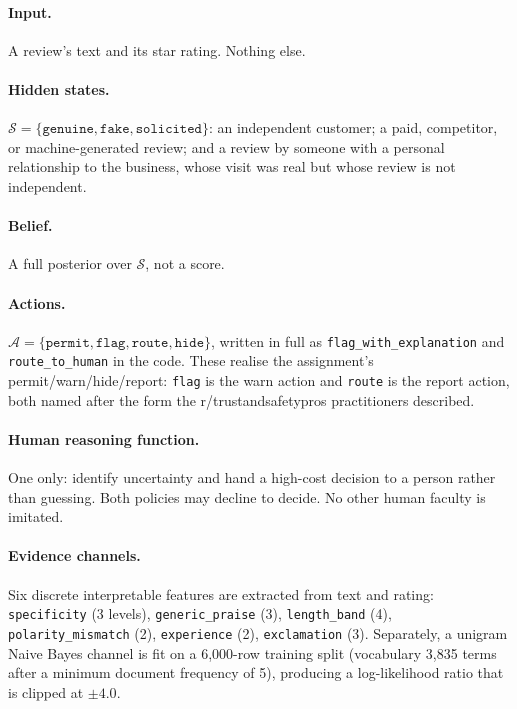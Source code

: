 \documentclass{article}
\begin{document}
\paragraph{Input.} A review's text and its star rating. Nothing else.

\paragraph{Hidden states.}
$\mathcal{S} = \{\texttt{genuine}, \texttt{fake}, \texttt{solicited}\}$:
an independent customer; a paid, competitor, or machine-generated review; and a
review by someone with a personal relationship to the business, whose visit was
real but whose review is not independent.

\paragraph{Belief.} A full posterior over $\mathcal{S}$, not a score.

\paragraph{Actions.}
$\mathcal{A} = \{\texttt{permit}, \texttt{flag}, \texttt{route},
\texttt{hide}\}$, written in full as \texttt{flag\_with\_explanation} and
\texttt{route\_to\_human} in the code. These realise the assignment's
permit/warn/hide/report: \texttt{flag} is the warn action
and \texttt{route} is the report action, both named after the form
the r/trustandsafetypros practitioners described.

\paragraph{Human reasoning function.}
One only: identify uncertainty and hand a high-cost decision to a person rather
than guessing. Both policies may decline to decide. No other human faculty is
imitated.

\paragraph{Evidence channels.}
Six discrete interpretable features are extracted from text and rating:
\texttt{specificity} (3 levels), \texttt{generic\_praise} (3),
\texttt{length\_band} (4), \texttt{polarity\_mismatch} (2),
\texttt{experience} (2), \texttt{exclamation} (3). Separately, a unigram Naive
Bayes channel is fit on a 6{,}000-row training split (vocabulary 3{,}835 terms
after a minimum document frequency of 5), producing a log-likelihood ratio that
is clipped at $\pm4.0$.
\end{document}
